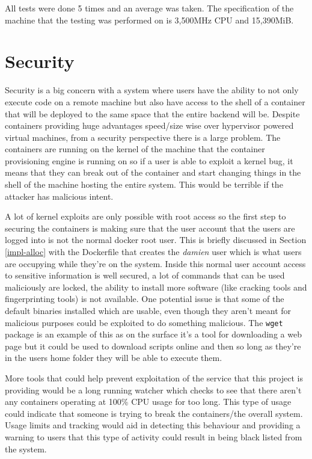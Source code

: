 All tests were done 5 times and an average was taken. The specification of the machine that the testing was performed on is 3,500MHz CPU and 15,390MiB.

\section{Security} \label{test-sec}


Security is a big concern with a system where users have the ability to not only execute code on a remote machine but also have access to the shell of a container that will be deployed to the same space that the entire backend will be. Despite containers providing huge advantages speed/size wise over hypervisor powered virtual machines, from a security perspective there is a large problem. The containers are running on the kernel of the machine that the container provisioning engine is running on so if a user is able to exploit a kernel bug, it means that they can break out of the container and start changing things in the shell of the machine hosting the entire system. This would be terrible if the attacker has malicious intent.

A lot of kernel exploits are only possible with root access so the first step to securing the containers is making sure that the user account that the users are logged into is not the normal docker root user. This is briefly discussed in Section \ref{impl-alloc} with the Dockerfile that creates the \textit{damien} user which is what users are occupying while they're on the system. Inside this normal user account access to sensitive information is well secured, a lot of commands that can be used maliciously are locked, the ability to install more software (like cracking tools and fingerprinting tools) is not available. One potential issue is that some of the default binaries installed which are usable, even though they aren't meant for malicious purposes could be exploited to do something malicious. The \texttt{wget} package is an example of this as on the surface it's a tool for downloading a web page but it could be used to download scripts online and then so long as they're in the users home folder they will be able to execute them. 

More tools that could help prevent exploitation of the service that this project is providing would be a long running watcher which checks to see that there aren't any containers operating at 100\% CPU usage for too long. This type of usage could indicate that someone is trying to break the containers/the overall system. Usage limits and tracking would aid in detecting this behaviour and providing a warning to users that this type of activity could result in being black listed from the system.

\pagebreak
